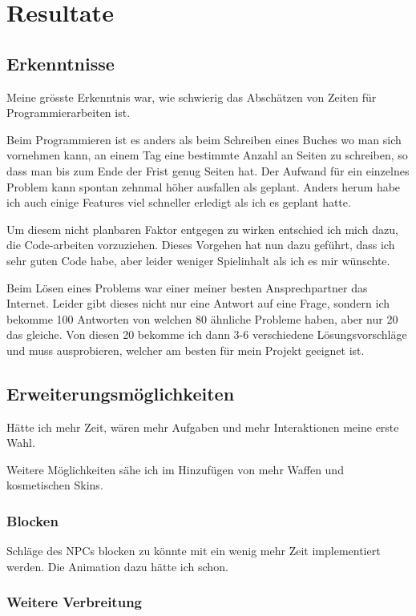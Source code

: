 \chapter{Resultate}

\section{Erkenntnisse}
Meine grösste Erkenntnis war, wie schwierig das Abschätzen von Zeiten für Programmierarbeiten ist.

\noindent Beim Programmieren ist es anders als beim Schreiben eines Buches wo man sich vornehmen kann, an einem Tag eine bestimmte Anzahl an Seiten zu schreiben, so dass man bis zum Ende der Frist genug Seiten hat.
Der Aufwand für ein einzelnes Problem kann spontan zehnmal höher ausfallen als geplant. Anders herum habe ich auch einige Features viel schneller erledigt als ich es geplant hatte.

\noindent Um diesem nicht planbaren Faktor entgegen zu wirken entschied ich mich dazu, die Code-arbeiten vorzuziehen.
Dieses Vorgehen hat nun dazu geführt, dass ich sehr guten Code habe, aber leider weniger Spielinhalt als ich es mir wünschte.

Beim Lösen eines Problems war einer meiner besten Ansprechpartner das Internet.
Leider gibt dieses nicht nur eine Antwort auf eine Frage, sondern ich bekomme 100 Antworten von welchen 80 ähnliche Probleme haben, aber nur 20 das gleiche.
Von diesen 20 bekomme ich dann 3-6 verschiedene Lösungsvorschläge und muss ausprobieren, welcher am besten für mein Projekt geeignet ist.




\section{Erweiterungsmöglichkeiten}
Hätte ich mehr Zeit, wären mehr Aufgaben und mehr Interaktionen meine erste Wahl.

Weitere Möglichkeiten sähe ich im Hinzufügen von mehr Waffen und kosmetischen Skins.

\subsection{Blocken}
Schläge des NPCs blocken zu könnte mit ein wenig mehr Zeit implementiert werden.
Die Animation dazu hätte ich schon.
\subsection{Weitere Verbreitung}

